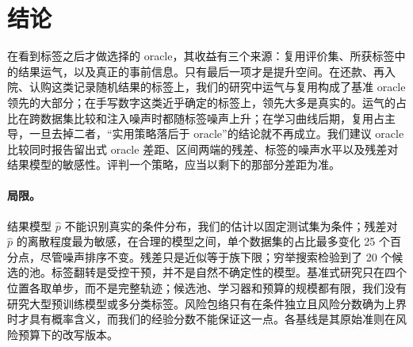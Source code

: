 \documentclass[runningheads]{llncs}
\begin{document}
\section{结论}
\label{sec:conclusion}
在看到标签之后才做选择的 oracle，其收益有三个来源：复用评价集、所获标签中的结果运气，以及真正的事前信息。只有最后一项才是提升空间。在还款、再入院、认购这类记录随机结果的标签上，我们的研究中运气与复用构成了基准 oracle 领先的大部分；在手写数字这类近乎确定的标签上，领先大多是真实的。运气的占比在跨数据集比较和注入噪声时都随标签噪声上升；在学习曲线后期，复用占主导，一旦去掉二者，“实用策略落后于 oracle”的结论就不再成立。我们建议 oracle 比较同时报告留出式 oracle 差距、区间两端的残差、标签的噪声水平以及残差对结果模型的敏感性。评判一个策略，应当以剩下的那部分差距为准。

\paragraph{局限。}结果模型 $\hat p$ 不能识别真实的条件分布，我们的估计以固定测试集为条件；残差对 $\hat p$ 的离散程度最为敏感，在合理的模型之间，单个数据集的占比最多变化 25 个百分点，尽管噪声排序不变。残差只是近似等于族下限；穷举搜索检验到了 20 个候选的池。标签翻转是受控干预，并不是自然不确定性的模型。基准式研究只在四个位置各取单步，而不是完整轨迹；候选池、学习器和预算的规模都有限，我们没有研究大型预训练模型或多分类标签。风险包络只有在条件独立且风险分数确为上界时才具有概率含义，而我们的经验分数不能保证这一点。各基线是其原始准则在风险预算下的改写版本。



\end{document}
